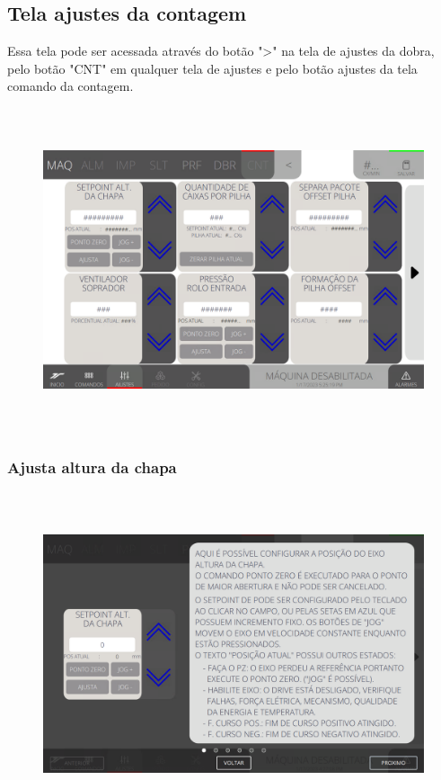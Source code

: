 \thispagestyle{fancy}
\vspace*{40 pt}
\subsection{Tela ajustes da contagem}\label{telaAjustesContagem}
 Essa tela pode ser acessada através do botão "\textgreater" na tela de ajustes da dobra, pelo botão "CNT" em qualquer tela de ajustes e pelo botão ajustes da tela comando da contagem.
 \vspace*{\fill}
 \begin{figure}[h]
  \centering
  \includegraphics[width=576px,height=360px]{src/imagesFlexo/08-count/settings/e-Tela-Principal.png}
\end{figure}
\vspace*{\fill}

\newpage
\thispagestyle{fancy}
\vspace*{40 pt}
\subsubsection{\small{Ajusta altura da chapa}}\label{telaAjustesContagemAjustaAlturaChapa}
\vspace*{\fill}
\begin{figure}[h]
  \centering
  \includegraphics[width=576px,height=360px]{src/imagesFlexo/08-count/settings/e-1.png}
\end{figure}
\vspace*{\fill}

